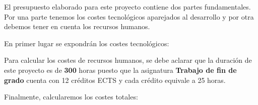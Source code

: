 


El presupuesto elaborado para este proyecto contiene dos partes fundamentales. Por una parte tenemos los costes tecnológicos aparejados al desarrollo y por otra debemos tener en cuenta los recursos humanos.

En primer lugar se expondrán los costes tecnológicos:



Para calcular los costes de recursos humanos, se debe aclarar que la duración de este proyecto es de \textbf{300} horas puesto que la asignatura \textbf{Trabajo de fin de grado} cuenta con 12 créditos ECTS y cada crédito equivale a 25 horas.



Finalmente, calcularemos los costes totales:



